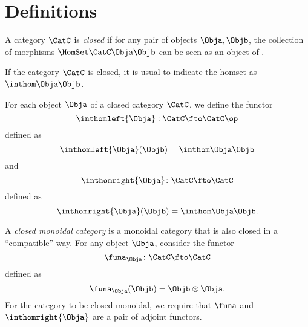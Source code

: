 \section{Definitions}

\begin{definition}
    \label{def:closed-category}
    A category $\CatC$ is \emph{closed} if for any pair of objects $\Obja,\Objb$,
    the collection of morphisms $\HomSet\CatC\Obja\Objb$ can be seen as an object of
    \CatC.

    If the category $\CatC$ is closed, it is usual to indicate the homset as $\inthom\Obja\Objb$.
\end{definition}
\begin{definition}
    \label{def:internal-hom-functors}
    For each object $\Obja$ of a closed category $\CatC$, we define the functor
    \begin{equation}
        \inthomleft{\Obja}: \CatC \fto \CatC\op
    \end{equation}
    defined as
    \begin{equation}
        \inthomleft{\Obja}(\Objb) = \inthom\Obja\Objb
    \end{equation}
    and
    \begin{equation}
        \inthomright{\Obja} \colon \CatC \fto \CatC
    \end{equation}
    defined as
    \begin{equation}
        \inthomright{\Obja}(\Objb) = \inthom\Obja\Objb.
    \end{equation}
\end{definition}

\begin{definition}
    \label{def:closed-monoidal-category}
    A \emph{closed monoidal category} is a monoidal category that is also closed
    in a ``compatible'' way.
    For any object $\Obja$, consider the functor
    \begin{equation}
        \funa_{\Obja} \colon \CatC \fto \CatC
    \end{equation}
    defined as
    \begin{equation}
        \funa_{\Obja}(\Objb) = \Objb \otimes \Obja,
    \end{equation}
    For the category to be closed monoidal, we require that $\funa$ and $\inthomright{\Obja}$ are a pair of adjoint functors.
\end{definition}

